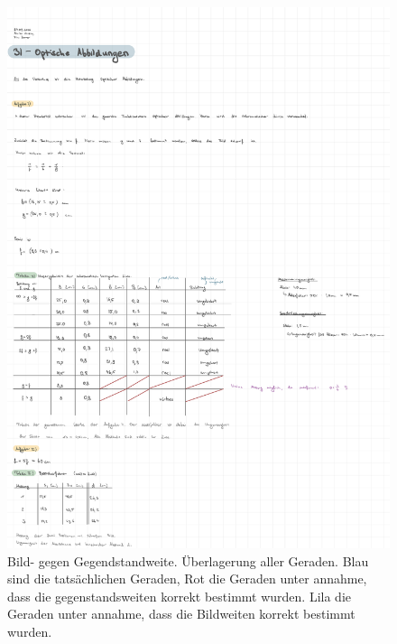 \begin{figure}[h!]
    \centering
    \includegraphics[width=\textwidth, page=8]{Protokolle/31/Chapter/Messprotokoll.pdf}
    \caption{Bild- gegen Gegendstandweite. Überlagerung aller Geraden. Blau sind die tatsächlichen Geraden, Rot die Geraden unter annahme, dass die gegenstandsweiten korrekt bestimmt wurden. Lila die Geraden unter annahme, dass die Bildweiten korrekt bestimmt wurden.}
    \label{fig:auswertung_achromat5}
\end{figure}

\twocolumn

